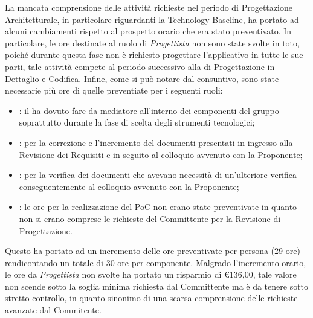 La mancata comprensione delle attività richieste nel periodo di Progettazione Architetturale, in particolare riguardanti la Technology Baseline, ha portato ad alcuni cambiamenti rispetto al prospetto orario che era stato preventivato. In particolare, le ore destinate al ruolo di \textit{Progettista} non sono state svolte in toto, poiché durante questa fase non è richiesto progettare l'applicativo in tutte le sue parti, tale attività compete al periodo successivo alla di Progettazione in Dettaglio e Codifica. Infine, come si può notare dal consuntivo, sono state necessarie più ore di quelle preventiate per i seguenti ruoli:
\begin{itemize}
	\item \RdP{}: il \Res{} ha dovuto fare da mediatore all'interno dei componenti del gruppo soprattutto durante la fase di scelta degli strumenti tecnologici;
	\item \ana{}: per la correzione e l'incremento del documenti presentati in ingresso alla Revisione dei Requisiti e in seguito al colloquio avvenuto con la Proponente;
	\item \ver{}: per la verifica dei documenti che avevano necessità di un'ulteriore verifica conseguentemente al colloquio avvenuto con la Proponente;
	\item \progr{}: le ore per la realizzazione del PoC non erano state preventivate  in quanto non si erano comprese le richieste del Committente per la Revisione di Progettazione. 
\end{itemize} 
Questo ha portato ad un incremento delle ore preventivate per persona (29 ore) rendicontando un totale di 30 ore per componente.
Malgrado l'incremento orario, le ore da \textit{Progettista} non svolte ha portato un risparmio di \euro 136,00, tale valore non scende sotto la soglia minima richiesta dal Committente ma è da tenere sotto stretto controllo, in quanto sinonimo di una scarsa comprensione delle richieste avanzate dal Commitente.

